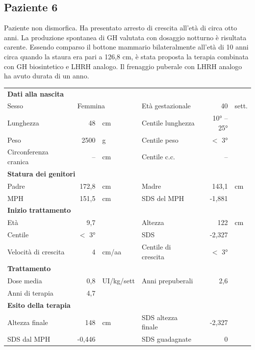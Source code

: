 \subsection*{Paziente 6}%

Paziente non dismorfica. Ha presentato arresto di crescita all'età di circa otto anni. La produzione spontanea di GH valutata con dosaggio notturno è risultata carente. Essendo comparso il bottone mammario bilateralmente all'età di 10 anni circa quando la staura era pari a 126,8 cm, è stata proposta la terapia combinata con GH biosintetico e LHRH analogo. Il frenaggio puberale con LHRH analogo ha avuto durata di un anno.   

\begin{table}[h]
\begin{tabular}{lrllrl}
\toprule
\multicolumn{6}{l}{\textbf{Dati alla nascita}}\\
Sesso 		& \multicolumn{2}{l}{Femmina} 	& Età gestazionale 		& 40 		& sett.\\
Lunghezza 	& 48 		& cm 				& Centile lunghezza		& 10° -- 25° 		\\
Peso 		& 2500 		& g					& Centile peso			& $<$ 3° 		\\
Circonferenza cranica	& -- 		& cm 	& Centile c.c.			& -- \\
\midrule
\multicolumn{6}{l}{\textbf{Statura dei genitori}}\\
Padre 		& 172,8 & cm 	& Madre 				& 143,1 & cm \\
MPH 		& 151,5 & cm 	& SDS del MPH 			& -1,881\\
\midrule
\multicolumn{6}{l}{\textbf{Inizio trattamento}} \\
Età	& 9,7 & 		& Altezza 				& 122 & cm  \\
Centile & $<$ 3° 	 &		& SDS		& -2,327 \\
Velocità di crescita & 4 & cm/aa	& Centile di crescita & $<$ 3°\\
\midrule
\multicolumn{6}{l}{\textbf{Trattamento}} \\
Dose media		& 0,8 & UI/kg/sett & Anni prepuberali & 2,6\\
Anni di terapia & 4,7\\
\midrule
\multicolumn{6}{l}{\textbf{Esito della terapia}} \\
Altezza finale			& 148 & cm 	& SDS altezza finale		& -2,327\\
SDS dal MPH				& -0,446 &		& SDS guadagnate 			& 0\\
\bottomrule
\end{tabular}
\end{table}
\clearpage


